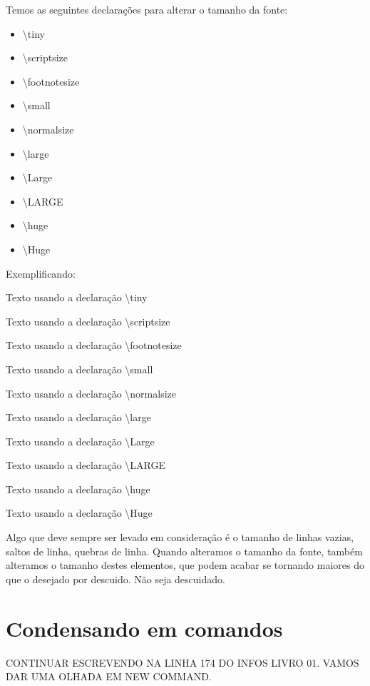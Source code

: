\documentclass[a4paper, 12pt, oneside]{book}
\begin{document}
Temos as seguintes declarações para alterar o tamanho da fonte:
\begin{multicols}{5}
\begin{itemize}
\noindent
\item \textbackslash tiny
\item \textbackslash scriptsize
\item \textbackslash footnotesize
\item \textbackslash small
\item \textbackslash normalsize
\item \textbackslash large
\item \textbackslash Large
\item \textbackslash LARGE
\item \textbackslash huge
\item \textbackslash Huge
\end{itemize}
\end{multicols}

Exemplificando:

{\tiny Texto usando a declaração \textbackslash tiny}

{\scriptsize Texto usando a declaração \textbackslash scriptsize}

{\footnotesize Texto usando a declaração \textbackslash footnotesize}

{\small Texto usando a declaração \textbackslash small}

{\normalsize Texto usando a declaração \textbackslash normalsize}

{\large Texto usando a declaração \textbackslash large}

{\Large Texto usando a declaração \textbackslash Large}

{\LARGE Texto usando a declaração \textbackslash LARGE}

{\huge Texto usando a declaração \textbackslash huge}

{\Huge Texto usando a declaração \textbackslash Huge}

Algo que deve sempre ser levado em consideração é o tamanho de linhas vazias, saltos de linha, quebras de linha.
Quando alteramos o tamanho da fonte, também alteramos o tamanho destes elementos, que podem acabar se tornando maiores do que o desejado por descuido.
Não seja descuidado.

\section{Condensando em comandos}
CONTINUAR ESCREVENDO NA LINHA 174 DO INFOS LIVRO 01. VAMOS DAR UMA OLHADA EM NEW COMMAND.
\end{document}

